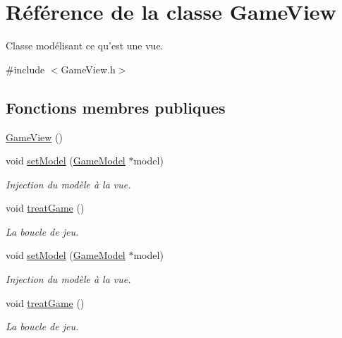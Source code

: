 \hypertarget{class_game_view}{\section{Référence de la classe Game\-View}
\label{class_game_view}
}


Classe modélisant ce qu'est une vue.  




{\ttfamily \#include $<$Game\-View.\-h$>$}

\subsection*{Fonctions membres publiques}
\begin{DoxyCompactItemize}
\item 
\hyperlink{class_game_view_a3851092ffd63639b4a498b70d279bdc0}{Game\-View} ()
\item 
void \hyperlink{class_game_view_a08a03be946eac62d5bdd9cd0e8262857}{set\-Model} (\hyperlink{class_game_model}{Game\-Model} $\ast$model)
\begin{DoxyCompactList}\small\item\em Injection du modèle à la vue. \end{DoxyCompactList}\item 
\hypertarget{class_game_view_aceb15f33e67a2b5ffc94c3bfbff50842}{void \hyperlink{class_game_view_aceb15f33e67a2b5ffc94c3bfbff50842}{treat\-Game} ()}\label{class_game_view_aceb15f33e67a2b5ffc94c3bfbff50842}

\begin{DoxyCompactList}\small\item\em La boucle de jeu. \end{DoxyCompactList}\item 
void \hyperlink{class_game_view_a08a03be946eac62d5bdd9cd0e8262857}{set\-Model} (\hyperlink{class_game_model}{Game\-Model} $\ast$model)
\begin{DoxyCompactList}\small\item\em Injection du modèle à la vue. \end{DoxyCompactList}\item 
\hypertarget{class_game_view_aceb15f33e67a2b5ffc94c3bfbff50842}{void \hyperlink{class_game_view_aceb15f33e67a2b5ffc94c3bfbff50842}{treat\-Game} ()}\label{class_game_view_aceb15f33e67a2b5ffc94c3bfbff50842}

\begin{DoxyCompactList}\small\item\em La boucle de jeu. \end{DoxyCompactList}\end{DoxyCompactItemize}


